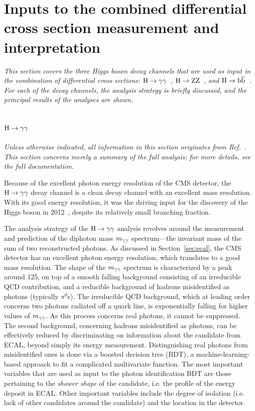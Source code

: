 \section{Inputs to the combined differential cross section measurement and interpretation}
\label{sec:inputs}

\emph{%
This section covers the three Higgs boson decay channels that are used as input in the combination of differential cross sections: $\mathrm{H}\to\mathrm{\gamma}\mathrm{\gamma}$~\cite{Sirunyan:2018kta}, $\mathrm{H}\to\mathrm{Z}\mathrm{Z}$~\cite{Sirunyan:2017exp}, and $\mathrm{H}\to\mathrm{b}\overline{\mathrm{b}}$~\cite{Sirunyan:2017dgc}.
% 
For each of the decay channels, the analysis strategy is briefly discussed, and the principal results of the analyses are shown.
}

\subsection{\texorpdfstring{$\mathrm{H}\to\mathrm{\gamma}\mathrm{\gamma}$}{H to gamma gamma}}

\emph{%
Unless otherwise indicated, all information in this section originates from Ref.~\cite{Sirunyan:2018kta}. This section concerns merely a summary of the full analysis; for more details, see the full documentation.
}

Because of the excellent photon energy resolution of the CMS detector, the $\mathrm{H}\to\mathrm{\gamma}\mathrm{\gamma}$ decay channel is a clean decay channel with an excellent mass resolution.
% 
With its good energy resolution, it was the driving input for the discovery of the Higgs boson in 2012~\cite{Aad:2012tfa,Chatrchyan:2012xdj,Chatrchyan:2013lba}, despite its relatively small branching fraction.


The analysis strategy of the $\mathrm{H}\to\mathrm{\gamma}\mathrm{\gamma}$ analysis revolves around the measurement and prediction of the diphoton mass $m_{\mathrm{\gamma}\mathrm{\gamma}}$ spectrum---the invariant mass of the sum of two reconstructed photons.
% 
As discussed in Section~\ref{sec:ecal}, the CMS detector has an excellent photon energy resolution, which translates to a good mass resolution.
% 
The shape of the $m_{\mathrm{\gamma}\mathrm{\gamma}}$ spectrum is characterized by a peak around 125\GeV, on top of a smooth falling background consisting of an irreducible QCD contribution, and a reducible background of hadrons misidentified as photons (typically $\pi^0$s).
% 
The irreducible QCD background, which at leading order concerns two photons radiated off a quark line, is exponentially falling for higher values of $m_{\mathrm{\gamma}\mathrm{\gamma}}$.
% 
As this process concerns real photons, it cannot be suppressed.
% 
The second background, concerning hadrons misidentified as photons, can be effectively reduced by discriminating on information about the candidate from ECAL, beyond simply its energy measurement.
% 
Distinguishing real photons from misidentified ones is done via a boosted decision tree (BDT), a machine-learning-based approach to fit a complicated multivariate function.
% 
The most important variables that are used as input to the photon identification BDT are those pertaining to the \textit{shower shape} of the candidate, i.e. the profile of the energy deposit in ECAL.
% 
Other important variables include the degree of isolation (i.e. lack of other candidates around the candidate) and the location in the detector.


